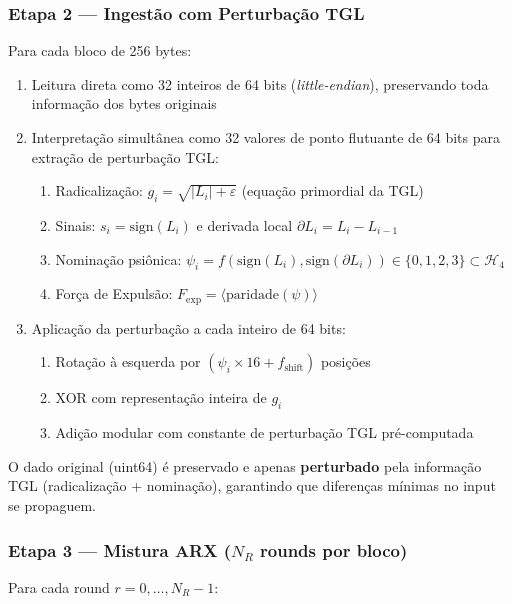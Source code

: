 \documentclass[12pt,a4paper]{article}
\begin{document}
\subsubsection{Etapa 2 --- Ingestão com Perturbação TGL}

Para cada bloco de 256 bytes:

\begin{enumerate}[nosep]
\item Leitura direta como 32 inteiros de 64 bits (\textit{little-endian}), preservando toda informação dos bytes originais
\item Interpretação simultânea como 32 valores de ponto flutuante de 64 bits para extração de perturbação TGL:
\begin{enumerate}[nosep]
\item Radicalização: $g_i = \sqrt{|L_i| + \varepsilon}$ (equação primordial da TGL)
\item Sinais: $s_i = \mathrm{sign}(L_i)$ e derivada local $\partial L_i = L_i - L_{i-1}$
\item Nominação psiônica: $\psi_i = f(\mathrm{sign}(L_i), \mathrm{sign}(\partial L_i)) \in \{0,1,2,3\} \subset \mathcal{H}_4$
\item Força de Expulsão: $F_{\mathrm{exp}} = \langle \mathrm{paridade}(\psi) \rangle$
\end{enumerate}
\item Aplicação da perturbação a cada inteiro de 64 bits:
\begin{enumerate}[nosep]
\item Rotação à esquerda por $(\psi_i \times 16 + f_{\mathrm{shift}})$ posições
\item XOR com representação inteira de $g_i$
\item Adição modular com constante de perturbação TGL pré-computada
\end{enumerate}
\end{enumerate}

O dado original (uint64) é preservado e apenas \textbf{perturbado} pela informação TGL (radicalização + nominação), garantindo que diferenças mínimas no input se propaguem.

\subsubsection{Etapa 3 --- Mistura ARX ($N_R$ rounds por bloco)}

Para cada round $r = 0, \ldots, N_R - 1$:
\end{document}
